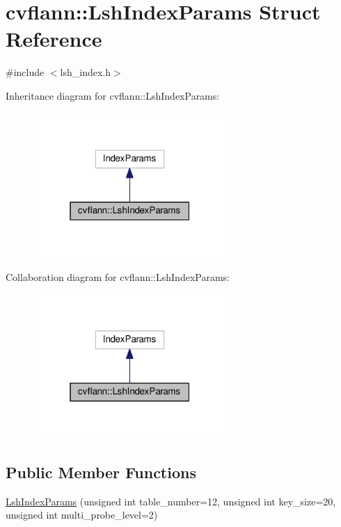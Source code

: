 \hypertarget{structcvflann_1_1LshIndexParams}{\section{cvflann\-:\-:Lsh\-Index\-Params Struct Reference}
\label{structcvflann_1_1LshIndexParams}
}


{\ttfamily \#include $<$lsh\-\_\-index.\-h$>$}



Inheritance diagram for cvflann\-:\-:Lsh\-Index\-Params\-:\nopagebreak
\begin{figure}[H]
\begin{center}
\leavevmode
\includegraphics[width=208pt]{structcvflann_1_1LshIndexParams__inherit__graph}
\end{center}
\end{figure}


Collaboration diagram for cvflann\-:\-:Lsh\-Index\-Params\-:\nopagebreak
\begin{figure}[H]
\begin{center}
\leavevmode
\includegraphics[width=208pt]{structcvflann_1_1LshIndexParams__coll__graph}
\end{center}
\end{figure}
\subsection*{Public Member Functions}
\begin{DoxyCompactItemize}
\item 
\hyperlink{structcvflann_1_1LshIndexParams_aab336d3de5ee1a82c0c1c6e85c78a94c}{Lsh\-Index\-Params} (unsigned int table\-\_\-number=12, unsigned int key\-\_\-size=20, unsigned int multi\-\_\-probe\-\_\-level=2)
\end{DoxyCompactItemize}



